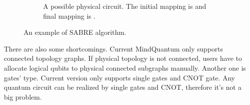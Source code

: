 \begin{figure}
\begin{subfigure}{0.45\textwidth}
		\caption{A possible physical circuit. The initial mapping is \code{[3, 2, 0, 1]} and final mapping is \code{[1, 2, 0, 3]}.}
		\label{fig:qubit-mapping-physical-circuit}
	\end{subfigure}
	
	\caption{An example of SABRE algorithm.}
\end{figure}

There are also some shortcomings. Current MindQuantum only supports connected topology graphs. If physical topology is not connected, users have to allocate logical qubits to physical connected subgraphs manually. 
Another one is gates' type. Current version only supports single gates and CNOT gate. Any quantum circuit can be realized by single gates and CNOT, therefore it's not a big problem.

